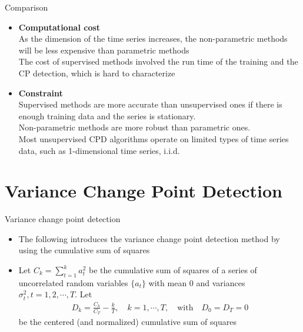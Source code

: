 \documentclass{beamer}
\begin{document}
\begin{frame}{Comparison}
    \begin{itemize}
        \item \textbf{Computational cost}\\
        As the dimension of the time series increases, the non-parametric methods will be less expensive than parametric methods\\
        \smallskip
        The cost of supervised methods involved the run time of the training and the CP detection, which is hard to characterize
        \bigskip
        
        \item \textbf{Constraint}\\
        Supervised methods are more accurate than unsupervised ones if there is enough training data and the series is stationary. \\
        \smallskip
        Non-parametric methods are more robust than parametric ones. \\
        \smallskip
        Most unsupervised CPD algorithms operate on limited types of time series data, such as 1-dimensional time series, i.i.d.
    \end{itemize}
\end{frame}

\section[Variance CPD]{Variance Change Point Detection}

\begin{frame}{Variance change point detection}
    \begin{itemize}
        \item The following introduces the variance change point detection method by using the cumulative sum of squares

        \item Let $C_k=\sum_{t=1}^k a_t^2$ be the cumulative sum of squares of a series of uncorrelated random variables $\{ a_t \}$ with mean $0$ and variances $\sigma_t^2, t = 1,2, \cdots, T$. Let
        \begin{align*}
            D_k = \frac{C_k}{C_T}-\frac{k}{T}, \quad k=1,\cdots,T, \quad \mbox{with} \quad D_0=D_T=0
        \end{align*}
         be the centered (and normalized) cumulative sum of squares
    \end{itemize}
\end{frame}
\end{document}
